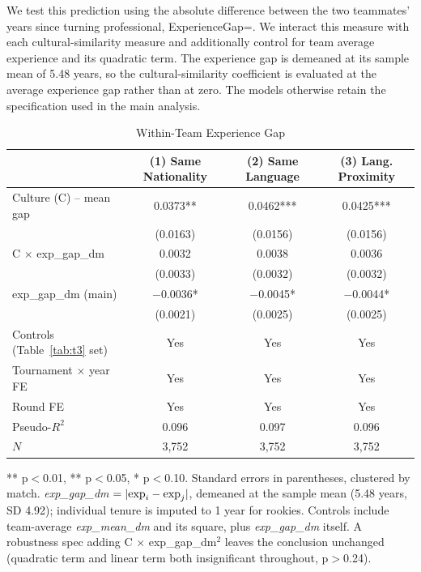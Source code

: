 \documentclass[10pt]{article}
\begin{document}
We test this prediction using the absolute difference between the two teammates' years since turning professional, ExperienceGap=. We interact this measure with each cultural-similarity measure and additionally control for team average experience and its quadratic term. The experience gap is demeaned at its sample mean of 5.48 years, so the cultural-similarity coefficient is evaluated at the average experience gap rather than at zero. The models otherwise retain the specification used in the main analysis.


\begin{table}[htbp]
\color{blue}
\centering
\caption{Within-Team Experience Gap \label{tab:t6b}}
\begin{threeparttable}
\begin{tabular}{lccc}
\toprule
 & (1) Same Nationality & (2) Same Language & (3) Lang. Proximity \\
\midrule
Culture (C) -- mean gap & 0.0373** & 0.0462*** & 0.0425*** \\
 & (0.0163) & (0.0156) & (0.0156) \\
C $\times$ exp\_gap\_dm & 0.0032 & 0.0038 & 0.0036 \\
 & (0.0033) & (0.0032) & (0.0032) \\
exp\_gap\_dm (main) & $-$0.0036* & $-$0.0045* & $-$0.0044* \\
 & (0.0021) & (0.0025) & (0.0025) \\
\midrule
Controls (Table~\ref{tab:t3} set) & Yes & Yes & Yes \\
Tournament $\times$ year FE & Yes & Yes & Yes \\
Round FE & Yes & Yes & Yes \\
Pseudo-$R^2$ & 0.096 & 0.097 & 0.096 \\
$N$ & 3,752 & 3,752 & 3,752 \\
\bottomrule
\end{tabular}
\begin{tablenotes}
\small
\item *** p$<$0.01, ** p$<$0.05, * p$<$0.10. Standard errors in parentheses, clustered by match. \textit{exp\_gap\_dm} $=|{\rm exp}_i-{\rm exp}_j|$, demeaned at the sample mean (5.48 years, SD 4.92); individual tenure is imputed to 1 year for rookies. Controls include team-average \textit{exp\_mean\_dm} and its square, plus \textit{exp\_gap\_dm} itself. A robustness spec adding C $\times$ exp\_gap\_dm$^2$ leaves the conclusion unchanged (quadratic term and linear term both insignificant throughout, p$>$0.24).
\end{tablenotes}
\end{threeparttable}
\end{table}
\FloatBarrier
\end{document}
